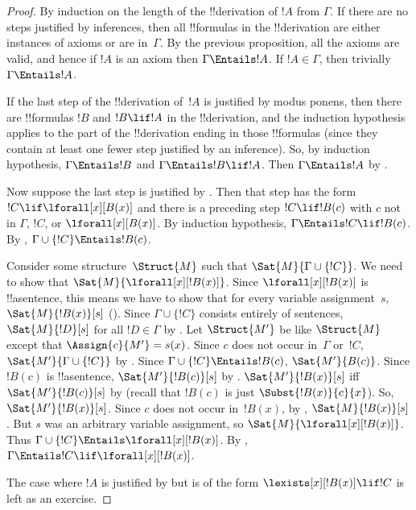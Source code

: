 \begin{proof}
By induction on the length of the !!{derivation} of $!A$ from
$\Gamma$. If there are no steps justified by inferences, then all
!!{formula}s in the !!{derivation} are either instances of axioms or are
in~$\Gamma$. By the previous proposition, all the axioms are
valid, and hence if $!A$ is an axiom then
$\Gamma \Entails !A$. If $!A \in \Gamma$, then trivially $\Gamma
\Entails !A$.

If the last step of the !!{derivation} of~$!A$ is justified by modus
ponens, then there are !!{formula}s $!B$ and $!B \lif !A$ in the
!!{derivation}, and the induction hypothesis applies to the part of
the !!{derivation} ending in those !!{formula}s (since they contain at
least one fewer step justified by an inference).  So, by induction
hypothesis, $\Gamma \Entails !B$ and $\Gamma \Entails !B \lif
!A$. Then $\Gamma \Entails !A$ by
.

Now suppose the last step is justified by
\QR. Then that step has the form $!C \lif \lforall[x][B(x)]$ and
there is a preceding step $!C \lif !B(c)$ with $c$ not in $\Gamma$,
$!C$, or $\lforall[x][B(x)]$. By induction hypothesis, $\Gamma
\Entails !C \lif !B(c)$. By
, $\Gamma \cup \{!C\} \Entails
!B(c)$.

Consider some structure~$\Struct{M}$ such that $\Sat{M}{\Gamma \cup
  \{!C\}}$.  We need to show that $\Sat{M}{\lforall[x][!B(x)]}$. Since
$\lforall[x][!B(x)]$ is !!a{sentence}, this means we have to show that
for every variable assignment~$s$, $\Sat{M}{!B(x)}[s]$
(). Since $\Gamma \cup \{!C\}$
consists entirely of sentences, $\Sat{M}{!D}[s]$ for all $!D \in
\Gamma$ by .  Let $\Struct{M'}$ be
like $\Struct{M}$ except that $\Assign{c}{M'} = s(x)$.  Since $c$ does
not occur in~$\Gamma$ or~$!C$, $\Sat{M'}{\Gamma \cup \{!C\}}$ by
. Since $\Gamma \cup \{!C\}
\Entails !B(c)$, $\Sat{M'}{B(c)}$.  Since $!B(c)$ is !!a{sentence},
$\Sat{M'}{!B(c)}[s]$ by
. $\Sat{M'}{!B(x)}[s]$ iff
$\Sat{M'}{!B(c)}[s]$ by  (recall that
$!B(c)$ is just $\Subst{!B(x)}{c}{x}$). So,
$\Sat{M'}{!B(x)}[s]$. Since $c$ does not occur in~$!B(x)$, by
, $\Sat{M}{!B(x)}[s]$. But $s$
was an arbitrary variable assignment, so
$\Sat{M}{\lforall[x][!B(x)]}$. Thus $\Gamma \cup \{!C\} \Entails
\lforall[x][!B(x)]$. By , $\Gamma
\Entails !C \lif \lforall[x][!B(x)]$.

The case where $!A$ is justified by \QR{} but is of the form
$\lexists[x][!B(x)] \lif !C$ is left as an exercise.
\end{proof}


